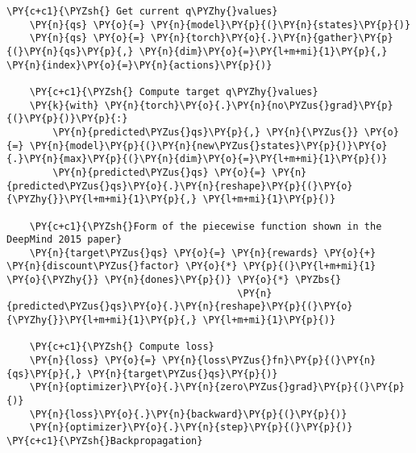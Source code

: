 \begin{tcolorbox}[breakable, size=fbox, boxrule=1pt, pad at break*=1mm,colback=cellbackground, colframe=cellborder]
\begin{Verbatim}[commandchars=\\\{\}]
    \PY{c+c1}{\PYZsh{} Get current q\PYZhy{}values}
    \PY{n}{qs} \PY{o}{=} \PY{n}{model}\PY{p}{(}\PY{n}{states}\PY{p}{)}
    \PY{n}{qs} \PY{o}{=} \PY{n}{torch}\PY{o}{.}\PY{n}{gather}\PY{p}{(}\PY{n}{qs}\PY{p}{,} \PY{n}{dim}\PY{o}{=}\PY{l+m+mi}{1}\PY{p}{,} \PY{n}{index}\PY{o}{=}\PY{n}{actions}\PY{p}{)}

    \PY{c+c1}{\PYZsh{} Compute target q\PYZhy{}values}
    \PY{k}{with} \PY{n}{torch}\PY{o}{.}\PY{n}{no\PYZus{}grad}\PY{p}{(}\PY{p}{)}\PY{p}{:}
        \PY{n}{predicted\PYZus{}qs}\PY{p}{,} \PY{n}{\PYZus{}} \PY{o}{=} \PY{n}{model}\PY{p}{(}\PY{n}{new\PYZus{}states}\PY{p}{)}\PY{o}{.}\PY{n}{max}\PY{p}{(}\PY{n}{dim}\PY{o}{=}\PY{l+m+mi}{1}\PY{p}{)}
        \PY{n}{predicted\PYZus{}qs} \PY{o}{=} \PY{n}{predicted\PYZus{}qs}\PY{o}{.}\PY{n}{reshape}\PY{p}{(}\PY{o}{\PYZhy{}}\PY{l+m+mi}{1}\PY{p}{,} \PY{l+m+mi}{1}\PY{p}{)}
    
    \PY{c+c1}{\PYZsh{}Form of the piecewise function shown in the DeepMind 2015 paper}
    \PY{n}{target\PYZus{}qs} \PY{o}{=} \PY{n}{rewards} \PY{o}{+} \PY{n}{discount\PYZus{}factor} \PY{o}{*} \PY{p}{(}\PY{l+m+mi}{1} \PY{o}{\PYZhy{}} \PY{n}{dones}\PY{p}{)} \PY{o}{*} \PYZbs{}
                                        \PY{n}{predicted\PYZus{}qs}\PY{o}{.}\PY{n}{reshape}\PY{p}{(}\PY{o}{\PYZhy{}}\PY{l+m+mi}{1}\PY{p}{,} \PY{l+m+mi}{1}\PY{p}{)} 
    
    \PY{c+c1}{\PYZsh{} Compute loss}
    \PY{n}{loss} \PY{o}{=} \PY{n}{loss\PYZus{}fn}\PY{p}{(}\PY{n}{qs}\PY{p}{,} \PY{n}{target\PYZus{}qs}\PY{p}{)}
    \PY{n}{optimizer}\PY{o}{.}\PY{n}{zero\PYZus{}grad}\PY{p}{(}\PY{p}{)}
    \PY{n}{loss}\PY{o}{.}\PY{n}{backward}\PY{p}{(}\PY{p}{)}   
    \PY{n}{optimizer}\PY{o}{.}\PY{n}{step}\PY{p}{(}\PY{p}{)}  \PY{c+c1}{\PYZsh{}Backpropagation}


\end{Verbatim}
\end{tcolorbox}

